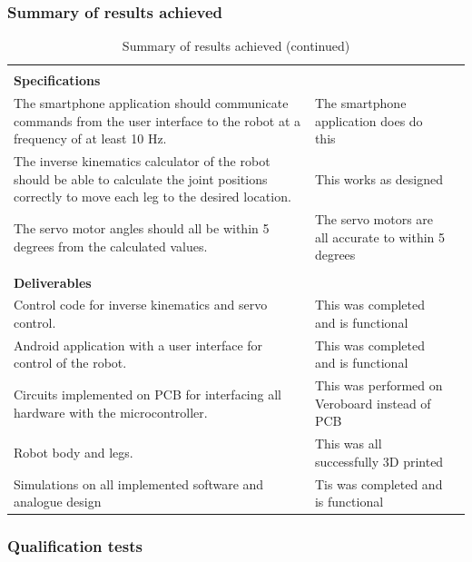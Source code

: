 \subsubsection{Summary of results achieved}
\begin{table}[H]
\begin{tabular}{|p{5cm}|p{5cm}|p{5cm}|}
\hline

\multicolumn{3}{|l|}{}\\
\multicolumn{3}{|l|}{\textbf{Specifications}}\\
\hline
The smartphone application should communicate commands from the user interface to the robot at a frequency of at least 10 Hz.&The smartphone application does do this&\\\hline

The inverse kinematics calculator of the robot should be able to calculate the joint positions correctly to move each leg to the desired location.& This works as designed&\\\hline

The servo motor angles should all be within 5 degrees from the calculated values.& The servo motors are all accurate to within 5 degrees&\\\hline

\multicolumn{3}{|l|}{}\\
\multicolumn{3}{|l|}{\textbf{Deliverables}}\\
\hline
Control code for inverse kinematics and servo control.&This was completed and is functional&\\\hline

Android application with a user interface for control of the robot.&This was completed and is functional&\\\hline

Circuits implemented on PCB for interfacing all hardware with the microcontroller.&This was performed on Veroboard instead of PCB&\\\hline

Robot body and legs.& This was all successfully 3D printed&\\\hline

Simulations on all implemented software and analogue design& Tis was completed and is functional&\\\hline

\end{tabular}
\caption{Summary of results achieved (continued)}
\label{tab:sum2}
\end{table}

\subsubsection{Qualification tests}

